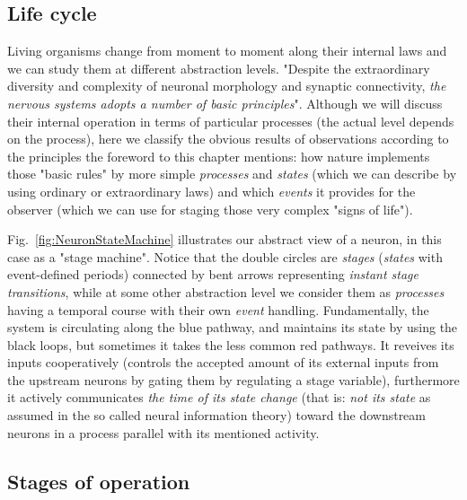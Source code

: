 

\subsection[Life cycle]{Life cycle\label{sec:Single-LifeCycle}}


Living organisms change from moment to
moment along their internal laws
and we can study them at different abstraction levels. "Despite the extraordinary diversity and complexity of neuronal morphology and synaptic connectivity,
\textit{the nervous systems adopts a number of
 basic principles}". \cite{JohnstonWuNeurophysiology:1995} Although we will discuss
their internal operation in terms of particular processes  (the actual level depends on the process),
here we classify the obvious results of observations according to the principles
the foreword to this chapter mentions: how nature implements those "basic rules" 
by more simple \textit{processes} and \textit{states} (which we can describe by using
ordinary or extraordinary laws) and which \textit{events} it
 provides for the observer
(which we can use for staging those very complex "signs of life"). 

Fig.~\ref{fig:NeuronStateMachine} illustrates our abstract view of a neuron,
in this case as a "stage machine".
Notice that the double circles are \textit{stages} (\textit{states} with event-defined periods) connected 
by bent arrows representing \textit{instant stage transitions}, while at some other abstraction level we consider them as \textit{processes} having a temporal course
with their own \textit{event} handling. Fundamentally, the system is circulating along the blue pathway, and maintains its state by using 
the black loops, but sometimes it takes the less common red pathways.
It reveives its inputs cooperatively
(controls the accepted amount of its external inputs from the upstream neurons by gating them by regulating a stage variable), furthermore
it actively communicates \textit{the time of its state change} (that is: \textit{not its state} as assumed in the so called neural information theory) toward the downstream neurons in a process
parallel with its mentioned activity.

\subsection[Stages]{Stages of operation\label{sec:Single-OperationStages}}

